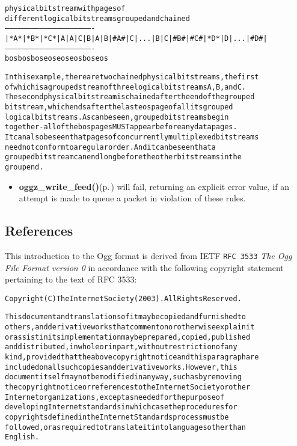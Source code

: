 \small\begin{alltt}               physical bitstream with pages of 
          different logical bitstreams grouped and chained
      -------------------------------------------------------------
      |*A*|*B*|*C*|A|A|C|B|A|B|#A\#|C|...|B|C|#B\#|#C\#|*D*|D|...|#D\#|
      -------------------------------------------------------------
       bos bos bos             eos           eos eos bos       eos\end{alltt}\normalsize 


\small\begin{alltt}   In this example, there are two chained physical bitstreams, the first
   of which is a grouped stream of three logical bitstreams A, B, and C.
   The second physical bitstream is chained after the end of the grouped
   bitstream, which ends after the last eos page of all its grouped
   logical bitstreams.  As can be seen, grouped bitstreams begin
   together - all of the bos pages MUST appear before any data pages.
   It can also be seen that pages of concurrently multiplexed bitstreams
   need not conform to a regular order.  And it can be seen that a
   grouped bitstream can end long before the other bitstreams in the
   group end.
\end{alltt}\normalsize 


\begin{itemize}
\item {\bf oggz\_\-write\_\-feed()}{\rm (p.\,\pageref{group__write__api_a2})} will fail, returning an explicit error value, if an attempt is made to queue a packet in violation of these rules.\end{itemize}
\subsection{References}\label{References}
This introduction to the Ogg format is derived from IETF {\tt RFC 3533} {\em The Ogg File Format version 0\/} in accordance with the following copyright statement pertaining to the text of RFC 3533:

\small\begin{alltt}
   Copyright (C) The Internet Society (2003).  All Rights Reserved.\end{alltt}\normalsize 


\small\begin{alltt}   This document and translations of it may be copied and furnished to
   others, and derivative works that comment on or otherwise explain it
   or assist in its implementation may be prepared, copied, published
   and distributed, in whole or in part, without restriction of any
   kind, provided that the above copyright notice and this paragraph are
   included on all such copies and derivative works.  However, this
   document itself may not be modified in any way, such as by removing
   the copyright notice or references to the Internet Society or other
   Internet organizations, except as needed for the purpose of
   developing Internet standards in which case the procedures for
   copyrights defined in the Internet Standards process must be
   followed, or as required to translate it into languages other than
   English.\end{alltt}\normalsize 


